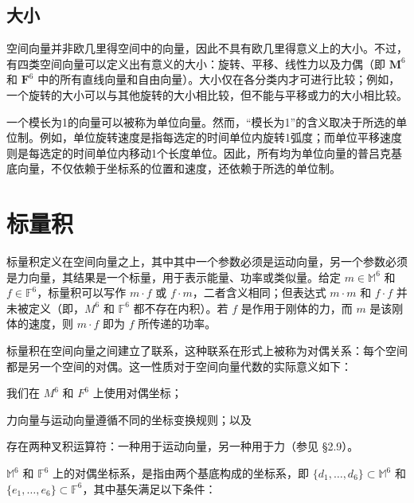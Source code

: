 \documentclass[10pt,a4paper]{book}
\theoremstyle{thmstyle} %
\theoremstyle{defstyle} %
\theoremstyle{prostyle} %
\begin{document}
\subsection{大小}





空间向量并非欧几里得空间中的向量，因此不具有欧几里得意义上的大小。不过，有四类空间向量可以定义出有意义的大小：旋转、平移、线性力以及力偶（即 $\mathbf{M}^{6}$ 和 $\mathbf{F}^{6}$ 中的所有直线向量和自由向量）。大小仅在各分类内才可进行比较；例如，一个旋转的大小可以与其他旋转的大小相比较，但不能与平移或力的大小相比较。



一个模长为1的向量可以被称为单位向量。然而，“模长为1”的含义取决于所选的单位制。例如，单位旋转速度是指每选定的时间单位内旋转1弧度；而单位平移速度则是每选定的时间单位内移动1个长度单位。因此，所有均为单位向量的普吕克基底向量，不仅依赖于坐标系的位置和速度，还依赖于所选的单位制。



\section{标量积}





标量积定义在空间向量之上，其中其中一个参数必须是运动向量，另一个参数必须是力向量，其结果是一个标量，用于表示能量、功率或类似量。给定 $m \in \mathbb{M}^{6}$ 和 $f \in \mathbb{F}^{6}$，标量积可以写作 $m \cdot f$ 或 $f \cdot m$，二者含义相同；但表达式 $m \cdot m$ 和 $f \cdot f$ 并未被定义（即，$M^{6}$ 和 $\mathbb{F}^{6}$ 都不存在内积）。若 $f$ 是作用于刚体的力，而 $m$ 是该刚体的速度，则 $m \cdot f$ 即为 $f$ 所传递的功率。



标量积在空间向量之间建立了联系，这种联系在形式上被称为对偶关系：每个空间都是另一个空间的对偶。这一性质对于空间向量代数的实际意义如下：



我们在 $M^{6}$ 和 $F^{6}$ 上使用对偶坐标；



力向量与运动向量遵循不同的坐标变换规则；以及



存在两种叉积运算符：一种用于运动向量，另一种用于力（参见 §2.9）。



$\mathbb{M}^{6}$ 和 $\mathbb{F}^{6}$ 上的对偶坐标系，是指由两个基底构成的坐标系，即 $\{d_{1},\ldots,d_{6}\}\subset\mathbb{M}^{6}$ 和 $\{e_{1},\ldots,e_{6}\}\subset\mathbb{F}^{6}$，其中基矢满足以下条件：
\end{document}

